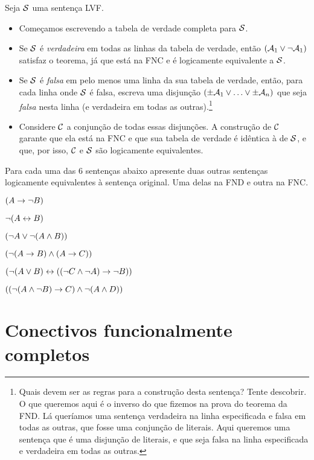 Seja $\mathcal{S}$ uma sentença LVF.
	\begin{itemize}
       	\item Começamos escrevendo a tabela de verdade completa para $\mathcal{S}$.
       	\item Se $\mathcal{S}$ é \emph{verdadeira} em todas as linhas da tabela de verdade, então $(\mathcal{A}_1 \vee \neg \mathcal{A}_1)$ satisfaz o teorema, já que está na FNC e é logicamente equivalente a $\mathcal{S}$.
       	\item Se $\mathcal{S}$ é \emph{falsa} em pelo menos uma linha da sua tabela de verdade, então, para cada linha onde $\mathcal{S}$ é falsa, escreva uma disjunção $(\pm\mathcal{A}_1 \vee \ldots \vee \pm\mathcal{A}_n)$ que seja \emph{falsa} nesta linha (e verdadeira em todas as outras).\footnote{
       	Quais devem ser as regras para a construção desta sentença? Tente descobrir. O que queremos aqui é o inverso do que fizemos na prova do teorema da FND.
       	Lá queríamos uma sentença verdadeira na linha especificada e falsa em todas as outras, que fosse uma conjunção de literais.
       	Aqui queremos uma sentença que é uma disjunção de literais, e que seja falsa na linha especificada e verdadeira em todas as outras.}
       	\item Considere $\mathcal{C}$ a conjunção de todas essas disjunções.
       	A construção de $\mathcal{C}$ garante que ela está na FNC e que sua tabela de verdade é idêntica à de $\mathcal{S}$, e que, por isso, $\mathcal{C}$ e $\mathcal{S}$ são logicamente equivalentes.
	\end{itemize}
       
 
\practiceproblems
\problempart
\label{pr.DNF}
Para cada uma das 6 sentenças abaixo apresente duas outras sentenças logicamente equivalentes à sentença original.
Uma delas na FND e outra na FNC.
	\begin{earg}
		\item $(A \rightarrow \neg B)$
		\item $\neg (A \leftrightarrow B)$
		\item $(\neg A \vee \neg (A \wedge B))$
		\item $(\neg (A \rightarrow B ) \wedge (A \rightarrow C))$
		\item $(\neg (A \vee B) \leftrightarrow ((\neg C \wedge \neg A) \rightarrow \neg B))$
		\item $((\neg (A \wedge \neg B) \rightarrow C) \wedge \neg (A \wedge D))$
	\end{earg}

\chapter{Conectivos funcionalmente completos}
        
